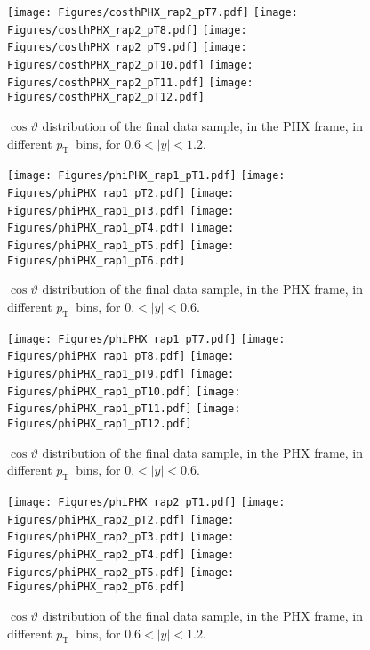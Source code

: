 \documentclass[12pt]{article}
\newcommand{\pt}{$p_{\mathrm{T}}$}
\begin{document}
\begin{figure}[htbp]
\centering
\texttt{[image: Figures/costhPHX\_rap2\_pT7.pdf]}
\texttt{[image: Figures/costhPHX\_rap2\_pT8.pdf]}
\texttt{[image: Figures/costhPHX\_rap2\_pT9.pdf]}
\texttt{[image: Figures/costhPHX\_rap2\_pT10.pdf]}
\texttt{[image: Figures/costhPHX\_rap2\_pT11.pdf]}
\texttt{[image: Figures/costhPHX\_rap2\_pT12.pdf]}
\caption{$\cos\vartheta$ distribution of the final data sample, 
	in the PHX frame, in different \pt\ bins, for $0.6 < |y| < 1.2$.}
\end{figure}
\clearpage

\begin{figure}[htbp]
\centering
\texttt{[image: Figures/phiPHX\_rap1\_pT1.pdf]}
\texttt{[image: Figures/phiPHX\_rap1\_pT2.pdf]}
\texttt{[image: Figures/phiPHX\_rap1\_pT3.pdf]}
\texttt{[image: Figures/phiPHX\_rap1\_pT4.pdf]}
\texttt{[image: Figures/phiPHX\_rap1\_pT5.pdf]}
\texttt{[image: Figures/phiPHX\_rap1\_pT6.pdf]}
\caption{$\cos\vartheta$ distribution of the final data sample, 
	in the PHX frame, in different \pt\ bins, for $0. < |y| < 0.6$.}
\end{figure}
\clearpage

\begin{figure}[htbp]
\centering
\texttt{[image: Figures/phiPHX\_rap1\_pT7.pdf]}
\texttt{[image: Figures/phiPHX\_rap1\_pT8.pdf]}
\texttt{[image: Figures/phiPHX\_rap1\_pT9.pdf]}
\texttt{[image: Figures/phiPHX\_rap1\_pT10.pdf]}
\texttt{[image: Figures/phiPHX\_rap1\_pT11.pdf]}
\texttt{[image: Figures/phiPHX\_rap1\_pT12.pdf]}
\caption{$\cos\vartheta$ distribution of the final data sample, 
	in the PHX frame, in different \pt\ bins, for $0. < |y| < 0.6$.}
\end{figure}
\clearpage

\begin{figure}[htbp]
\centering
\texttt{[image: Figures/phiPHX\_rap2\_pT1.pdf]}
\texttt{[image: Figures/phiPHX\_rap2\_pT2.pdf]}
\texttt{[image: Figures/phiPHX\_rap2\_pT3.pdf]}
\texttt{[image: Figures/phiPHX\_rap2\_pT4.pdf]}
\texttt{[image: Figures/phiPHX\_rap2\_pT5.pdf]}
\texttt{[image: Figures/phiPHX\_rap2\_pT6.pdf]}
\caption{$\cos\vartheta$ distribution of the final data sample, 
	in the PHX frame, in different \pt\ bins, for $0.6 < |y| < 1.2$.}
\end{figure}
\clearpage
\end{document}
